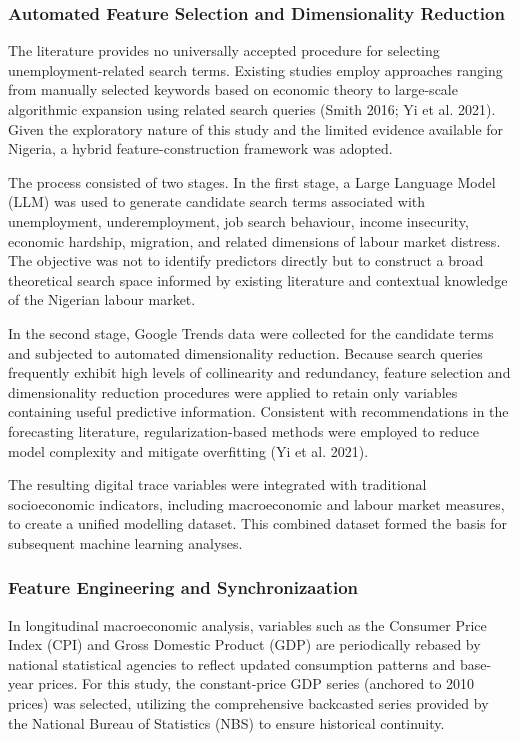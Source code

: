 \documentclass[
  letterpaper,
  DIV=11,
  numbers=noendperiod]{scrartcl}
\begin{document}
\subsubsection{Automated Feature Selection and Dimensionality
Reduction}\label{automated-feature-selection-and-dimensionality-reduction}

The literature provides no universally accepted procedure for selecting
unemployment-related search terms. Existing studies employ approaches
ranging from manually selected keywords based on economic theory to
large-scale algorithmic expansion using related search queries (Smith
2016; Yi et al. 2021). Given the exploratory nature of this study and
the limited evidence available for Nigeria, a hybrid
feature-construction framework was adopted.

The process consisted of two stages. In the first stage, a Large
Language Model (LLM) was used to generate candidate search terms
associated with unemployment, underemployment, job search behaviour,
income insecurity, economic hardship, migration, and related dimensions
of labour market distress. The objective was not to identify predictors
directly but to construct a broad theoretical search space informed by
existing literature and contextual knowledge of the Nigerian labour
market.

In the second stage, Google Trends data were collected for the candidate
terms and subjected to automated dimensionality reduction. Because
search queries frequently exhibit high levels of collinearity and
redundancy, feature selection and dimensionality reduction procedures
were applied to retain only variables containing useful predictive
information. Consistent with recommendations in the forecasting
literature, regularization-based methods were employed to reduce model
complexity and mitigate overfitting (Yi et al. 2021).

The resulting digital trace variables were integrated with traditional
socioeconomic indicators, including macroeconomic and labour market
measures, to create a unified modelling dataset. This combined dataset
formed the basis for subsequent machine learning analyses.

\subsubsection{Feature Engineering and
Synchronizaation}\label{feature-engineering-and-synchronizaation}

In longitudinal macroeconomic analysis, variables such as the Consumer
Price Index (CPI) and Gross Domestic Product (GDP) are periodically
rebased by national statistical agencies to reflect updated consumption
patterns and base-year prices. For this study, the constant-price GDP
series (anchored to 2010 prices) was selected, utilizing the
comprehensive backcasted series provided by the National Bureau of
Statistics (NBS) to ensure historical continuity.
\end{document}
